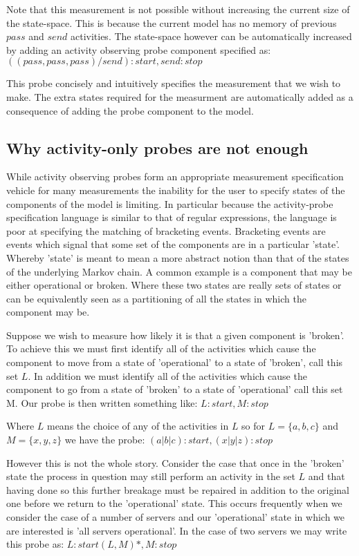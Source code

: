 \documentclass[times, 10pt,twocolumn]{article}
\newcommand{\showprobe}[1]{$#1$}
\newcommand{\quoteActivity}[1]{$#1$}
\begin{document}
Note that this measurement is not possible without increasing the current
size of the state-space. This is because the current model has no memory
of previous \quoteActivity{pass} and \quoteActivity{send} activities.
The state-space however can be automatically increased by adding an
activity observing probe component specified as:
\showprobe{((pass, pass, pass)/send):start, send: stop}

This probe concisely and intuitively specifies the measurement that we wish
to make. The extra states required for the measurment are automatically added
as a consequence of adding the probe component to the model.


\subsection{Why activity-only probes are not enough}
\label{sub:section:activity:probes:insufficient}

While activity observing probes form an appropriate measurement specification
vehicle for many measurements the inability for the user to specify states
of the components of the model is limiting. 
In particular because the activity-probe specification language is similar
to that of regular expressions, the language is poor at specifying the
matching of bracketing events.
Bracketing events are events which signal that some set of the components
are in a particular 'state'.
Whereby 'state' is meant to mean a more abstract notion than that of the states
of the underlying Markov chain. A common example is a component that may be either
operational or broken. Where these two states are really sets of states or can
be equivalently seen as a partitioning of all the states in which the component
may be.

Suppose we wish to measure how likely it is that a given component is 'broken'.
To achieve this we must first identify all of the activities which cause the
component to move from a state of 'operational' to a state of 'broken',
call this set $L$.
In addition we must identify all of the activities which cause the component
to go from a state of 'broken' to a state of 'operational' call this set M.
Our probe is then written something like:
\showprobe{L:start, M:stop}

Where $L$ means the choice of any of the activities in $L$ so for 
$L = \{a,b,c\}$ and $M = \{x,y,z\}$ we have the probe:
\showprobe{(a|b|c):start, (x|y|z):stop}

However this is not the whole story. Consider the case that once in the 'broken'
state the process in question may still perform an activity in the set $L$
and that having done so this further breakage must be repaired in addition
to the original one before we return to the 'operational' state.
This occurs frequently when we consider the case of a number of servers and
our 'operational' state in which we are interested is 'all servers operational'.
In the case of two servers we may write this probe as:
\showprobe{L:start (L, M) *, M:stop}
\end{document}
